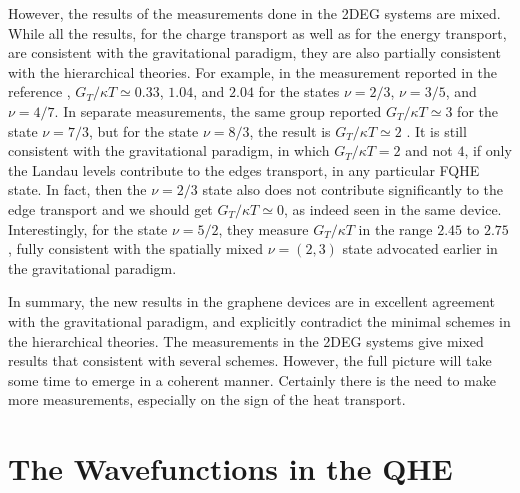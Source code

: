 \documentclass[aps,preprint,12pt,tightenlines]{revtex4}%
\begin{document}
However, the results of the measurements done in the 2DEG systems are mixed.
While all the results, for the charge transport as well as for the energy
transport, are consistent with the gravitational paradigm, they are also
partially consistent with the hierarchical theories. For example, in the
measurement reported in the reference \cite{Mitali2017}, $G_{T}/\kappa
T\simeq0.33$, $1.04$, and $2.04$ for the states $\nu=2/3$, $\nu=3/5$, and
$\nu=4/7$. In separate measurements, the same group reported $G_{T}/\kappa
T\simeq3$ for the state $\nu=7/3$, but for the state $\nu=8/3$, the result is
$G_{T}/\kappa T\simeq2$ \cite{Mitali2018}. It is still consistent with the
gravitational paradigm, in which $G_{T}/\kappa T=2$ and not $4$, if only the
Landau levels contribute to the edges transport, in any particular FQHE state.
In fact, then the $\nu=2/3$ state also does not contribute significantly to
the edge transport and we should get $G_{T}/\kappa T\simeq0$, as indeed seen
in the same device. Interestingly, for the state $\nu=5/2$, they measure
$G_{T}/\kappa T$ in the range $2.45$ to $2.75$, fully consistent with the
spatially mixed $\nu=\left(  2,3\right)  $ state advocated earlier in the
gravitational paradigm.

In summary, the new results in the graphene devices are in excellent agreement
with the gravitational paradigm, and explicitly contradict the minimal
schemes in the hierarchical theories. The measurements in the 2DEG systems
give mixed results that consistent with several schemes. However, the full
picture will take some time to emerge in a coherent manner. Certainly there is
the need to make more measurements, especially on the sign of the heat transport.

\section{The Wavefunctions in the QHE}
\end{document}
